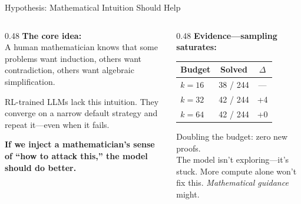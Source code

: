 \documentclass[aspectratio=169, 11pt]{beamer}
\begin{document}
\begin{frame}{Hypothesis: Mathematical Intuition Should Help}

\begin{columns}[T]
\begin{column}{0.48\textwidth}
\textbf{The core idea:}\\[0.3em]
A human mathematician knows that some problems want induction, others want contradiction, others want algebraic simplification.

\vspace{0.4em}
RL-trained LLMs lack this intuition. They converge on a narrow default strategy and repeat it---even when it fails.

\vspace{0.4em}
\textbf{If we inject a mathematician's sense of ``how to attack this,'' the model should do better.}
\end{column}
\begin{column}{0.48\textwidth}
\textbf{Evidence---sampling saturates:}

\vspace{0.3em}
\begin{tabular}{@{}lcc@{}}
\toprule
Budget & Solved & $\Delta$ \\
\midrule
$k=16$ & 38 / 244 & --- \\
$k=32$ & 42 / 244 & +4 \\
$k=64$ & \alert{42 / 244} & \alert{+0} \\
\bottomrule
\end{tabular}

\vspace{0.4em}
Doubling the budget: \alert{zero new proofs}.\\[0.3em]
The model isn't exploring---it's stuck. More compute alone won't fix this. \emph{Mathematical guidance} might.
\end{column}
\end{columns}
\end{frame}
\end{document}

